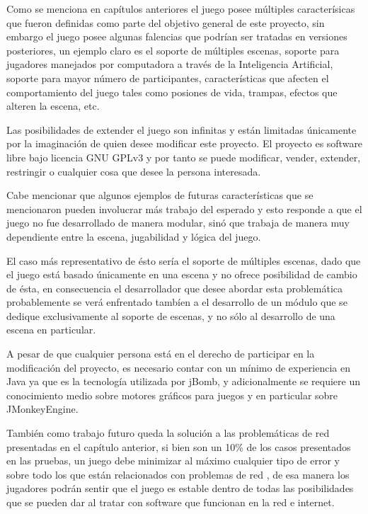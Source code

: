 \documentclass[a4paper,12pt,openany,oneside]{book}
\begin{document}
Como se menciona en capítulos anteriores el juego posee múltiples caracterísicas que fueron definidas como parte del objetivo general de este proyecto, sin embargo el juego posee algunas falencias que podrían ser tratadas en versiones posteriores, un ejemplo claro es el soporte de múltiples escenas, soporte para jugadores manejados por computadora a través de la Inteligencia Artificial, soporte para mayor número de participantes, características que afecten el comportamiento del juego tales como posiones de vida, trampas, efectos que alteren la escena, etc. 

Las posibilidades de extender el juego son infinitas y están limitadas únicamente por la imaginación de quien desee modificar este proyecto. El proyecto es software libre bajo licencia GNU GPLv3 y por tanto se puede modificar, vender, extender, restringir o cualquier cosa que desee la persona interesada.

Cabe mencionar que algunos ejemplos de futuras características que se mencionaron pueden involucrar más trabajo del esperado y esto responde a que el juego no fue desarrollado de manera modular, sinó que trabaja de manera muy dependiente entre la escena, jugabilidad y lógica del juego.

El caso más representativo de ésto sería el soporte de múltiples escenas, dado que el juego está basado únicamente en una escena y no ofrece posibilidad de cambio de ésta, en consecuencia el desarrollador que desee abordar esta problemática probablemente se verá enfrentado tambíen a el desarrollo de un módulo que se dedique exclusivamente al soporte de escenas, y no sólo al desarrollo de una escena en particular.

A pesar de que cualquier persona está en el derecho de participar en la modificación del proyecto, es necesario contar con un mínimo de experiencia en Java ya que es la tecnología utilizada por jBomb, y adicionalmente se requiere un conocimiento medio sobre motores gráficos para juegos y en particular sobre JMonkeyEngine.

También como trabajo futuro queda la solución a las problemáticas de red presentadas en el capítulo anterior, si bien son un 10\% de los casos presentados en las pruebas, un juego debe minimizar al máximo cualquier tipo de error y sobre todo los que están relacionados con problemas de red \cite{VALVE2}, de esa manera los jugadores podrán sentir que el juego es estable dentro de todas las posibilidades que se pueden dar al tratar con software que funcionan en la red e internet.
\end{document}
